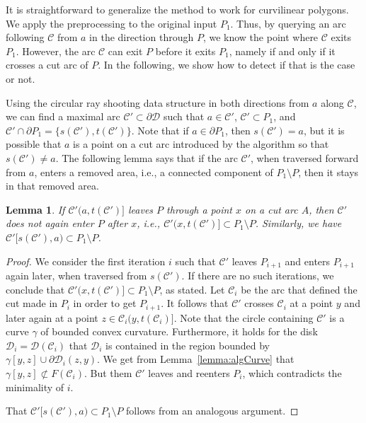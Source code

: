 \documentclass{article}
\newcommand{\PP}{P}
\newcommand{\cutreg}{F}
\newcommand{\cut}{\mathcal C}
\newcommand{\cutdisk}{\mathcal D}
\newcommand{\start}{s}
\newcommand{\terminal}{t}
\newcommand{\arcA}{A}
\newtheorem{lemma}[theorem]{Lemma}
\begin{document}
It is straightforward to generalize the method to work for curvilinear polygons.
We apply the preprocessing to the original input $\PP_1$.
Thus, by querying an arc following $\cut$ from $a$ in the direction through $\PP$, we know the point where $\cut$ exits $\PP_1$.
However, the arc $\cut$ can exit $\PP$ before it exits $\PP_1$, namely if and only if it crosses a cut arc of $\PP$.
In the following, we show how to detect if that is the case or not.

Using the circular ray shooting data structure in both directions from $a$ along $\cut$, we can find a maximal arc $\cut'\subset\partial\cutdisk$ such that $a\in\cut'$, $\cut'\subset\PP_1$, and $\cut'\cap \partial\PP_1=\{\start(\cut'),\terminal(\cut')\}$.
Note that if $a\in\partial\PP_1$, then $\start(\cut')=a$, but it is possible that $a$ is a point on a cut arc introduced by the algorithm so that $\start(\cut')\neq a$.
The following lemma says that if the arc $\cut'$, when traversed forward from $a$, enters a removed area, i.e., a connected component of $\PP_1\setminus\PP$, then it stays in that removed area.

\begin{lemma}\label{charArcB}
If $\cut'(a,\terminal(\cut')]$ leaves $\PP$ through a point $x$ on a cut arc $\arcA$, then $\cut'$ does not again enter $\PP$ after $x$, i.e., $\cut'(x,\terminal(\cut')]\subset\PP_1\setminus\PP$.
Similarly, we have $\cut'[\start(\cut'),a)\subset\PP_1\setminus\PP$.
\end{lemma}

\begin{proof}
We consider the first iteration $i$ such that $\cut'$ leaves $\PP_{i+1}$ and enters $\PP_{i+1}$ again later, when traversed from $\start(\cut')$.
If there are no such iterations, we conclude that $\cut'(x,\terminal(\cut')]\subset\PP_1\setminus\PP$, as stated.
Let $\cut_i$ be the arc that defined the cut made in $\PP_i$ in order to get $\PP_{i+1}$.
It follows that $\cut'$ crosses $\cut_i$ at a point $y$ and later again at a point $z\in \cut_i(y,\terminal(\cut_i)]$.
Note that the circle containing $\cut'$ is a curve $\gamma$ of bounded convex curvature.
Furthermore, it holds for the disk $\cutdisk_i=\cutdisk(\cut_i)$ that $\cutdisk_i$ is contained in the region bounded by $\gamma[y,z]\cup \partial\cutdisk_i(z,y)$.
We get from Lemma~\ref{lemma:algCurve} that $\gamma[y,z]\not\subset \cutreg(\cut_i)$.
But them $\cut'$ leaves and reenters $\PP_i$, which contradicts the minimality of $i$.

That $\cut'[\start(\cut'),a)\subset\PP_1\setminus\PP$ follows from an analogous argument.
\end{proof}
\end{document}
